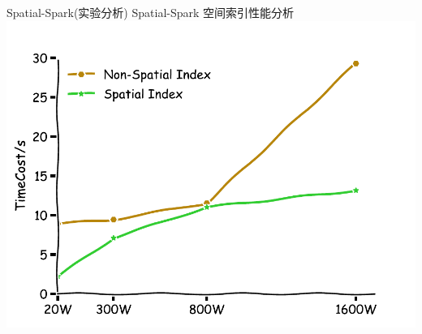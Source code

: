 \begin{frame}[t]{Spatial-Spark(实验分析)}
    Spatial-Spark 空间索引性能分析
    \vspace{1em}
    \includegraphics[width=0.9 \textwidth]{figures/index.pdf}
\end{frame}


